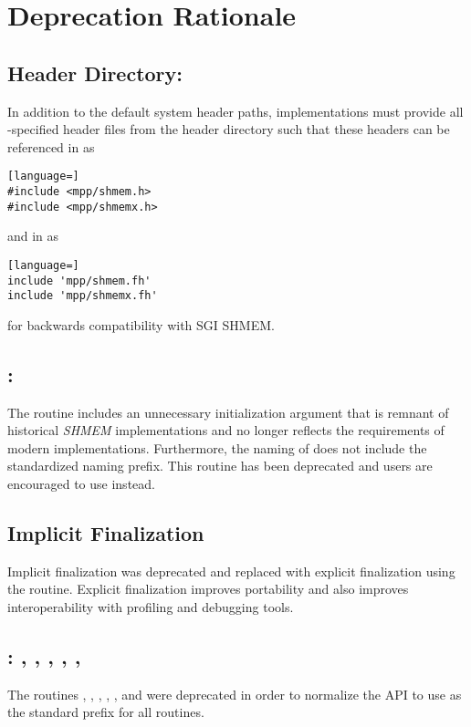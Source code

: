 \section{Deprecation Rationale}\label{dep:rationale}

\subsection{Header Directory: }
\label{dep:mpp_header}
In addition to the default system header paths, \openshmem implementations
must provide all \openshmem-specified header files from the 
header directory such that these headers can be referenced in \CorCpp as
\begin{lstlisting}[language=]
#include <mpp/shmem.h>
#include <mpp/shmemx.h>
\end{lstlisting}
and in \Fortran as
\begin{lstlisting}[language=]
include 'mpp/shmem.fh'
include 'mpp/shmemx.fh'
\end{lstlisting}
for backwards compatibility with \ac{SGI} SHMEM.

\subsection{\CorCpp: }
\label{dep:start_pes}
The \CorCpp routine  includes an unnecessary initialization
argument that is remnant of historical \emph{SHMEM} implementations and no
longer reflects the requirements of modern \openshmem implementations.
Furthermore, the naming of  does not include the standardized
\shmemprefixLC{} naming prefix. This routine has been deprecated and
\openshmem users are encouraged to use  instead.

\subsection{Implicit Finalization}
Implicit finalization was deprecated and replaced with explicit finalization using the
 routine.  Explicit finalization improves portability and
also improves interoperability with profiling and debugging tools.

\subsection{\CorCpp: , , ,
    , , }
\label{dep:func_not_shmemunder}
The \CorCpp routines , , ,
, , and  were deprecated in order
to normalize the \openshmem \ac{API} to use \shmemprefixLC{} as the standard
prefix for all routines.

